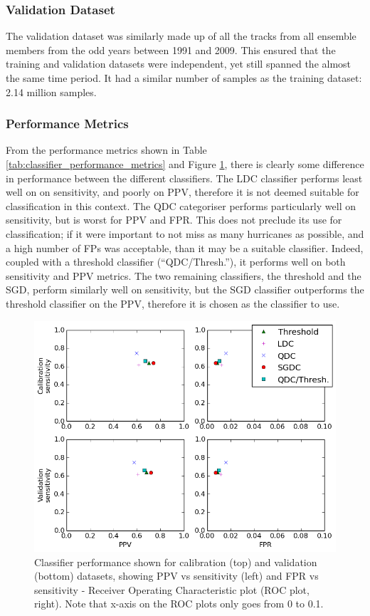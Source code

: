 \documentclass[pdftex,12pt,a4paper]{report}
\begin{document}
\subsubsection{Validation Dataset} 
The validation dataset was similarly made up of all the tracks from all ensemble members from the
odd years between 1991 and 2009. This ensured that the training and validation datasets were
independent, yet still spanned the almost the same time period. It had a similar number of samples
as the training dataset: 2.14 million samples.

\subsubsection{Performance Metrics}

From the performance metrics shown in Table \ref{tab:classifier_performance_metrics} and Figure
\ref{fig:ppv_and_fpr_vs_sens}, there is clearly some difference in performance between the different
classifiers. The LDC classifier performs least well on on sensitivity, and poorly on PPV, therefore
it is not deemed suitable for classification in this context. The QDC categoriser performs
particularly well on sensitivity, but is worst for PPV and FPR. This does not preclude its use for
classification; if it were important to not miss as many hurricanes as possible, and a high number
of FPs was acceptable, than it may be a suitable classifier. Indeed, coupled with a threshold
classifier (``QDC/Thresh.''), it performs well on both sensitivity and PPV metrics. The two
remaining classifiers, the threshold and the SGD, perform similarly well on sensitivity, but the SGD
classifier outperforms the threshold classifier on the PPV, therefore it is chosen as the classifier
to use.

\begin{figure}[hb!]
    \centering
    \includegraphics[width=\textwidth]{figures/ppv_and_fpr_vs_sens}
    \caption{Classifier performance shown for calibration (top) and validation (bottom) datasets,
        showing PPV vs sensitivity (left) and FPR vs sensitivity - Receiver Operating Characteristic
        plot (ROC plot, right). Note that x-axis on the ROC plots only goes from 0 to 0.1. }
    \label{fig:ppv_and_fpr_vs_sens}
\end{figure}
\end{document}

